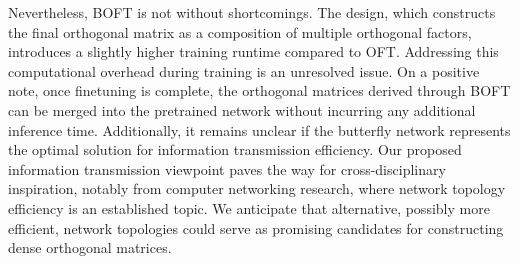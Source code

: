 Nevertheless, BOFT is not without shortcomings. The design, which constructs the final orthogonal matrix as a composition of multiple orthogonal factors, introduces a slightly higher training runtime compared to OFT. Addressing this computational overhead during training is an unresolved issue. On a positive note, once finetuning is complete, the orthogonal matrices derived through BOFT can be merged into the pretrained network without incurring any additional inference time. Additionally, it remains unclear if the butterfly network represents the optimal solution for information transmission efficiency. Our proposed information transmission viewpoint paves the way for cross-disciplinary inspiration, notably from computer networking research, where network topology efficiency is an established topic. We anticipate that alternative, possibly more efficient, network topologies could serve as promising candidates for constructing dense orthogonal matrices.